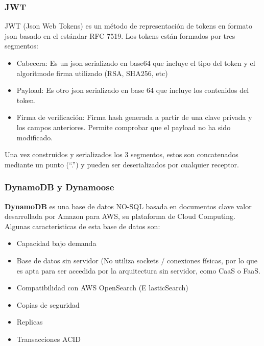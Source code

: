 \hypertarget{jwt}{%
\subsubsection{JWT}\label{jwt}}

JWT (Json Web Tokens) es un método de representación de tokens en
formato json basado en el estándar RFC 7519. Los tokens están formados
por tres segmentos:

\begin{itemize}
\item
  Cabecera: Es un json serializado en base64 que incluye el tipo del
  token y el algoritmode firma utilizado (RSA, SHA256, etc)
\item
  Payload: Es otro json serializado en base 64 que incluye los
  contenidos del token.
\item
  Firma de verificación: Firma hash generada a partir de una clave
  privada y los campos anteriores. Permite comprobar que el payload no
  ha sido modificado.
\end{itemize}

Una vez construidos y serializados los 3 segmentos, estos son
concatenados mediante un punto (``.'') y pueden ser deserializados por
cualquier receptor.

\hypertarget{dynamodb-y-dynamoose}{%
\subsubsection{DynamoDB y Dynamoose}\label{dynamodb-y-dynamoose}}

\textbf{DynamoDB} es una base de datos NO-SQL basada en documentos clave
valor desarrollada por Amazon para AWS, su plataforma de Cloud
Computing.\\
Algunas características de esta base de datos son:

\begin{itemize}
\item
  Capacidad bajo demanda
\item
  Base de datos sin servidor (No utiliza sockets / conexiones físicas,
  por lo que es apta para ser accedida por la arquitectura sin servidor,
  como CaaS o FaaS.
\item
  Compatibilidad con AWS OpenSearch (E lasticSearch)
\item
  Copias de seguridad
\item
  Replicas
\item
  Transacciones ACID
\end{itemize}

